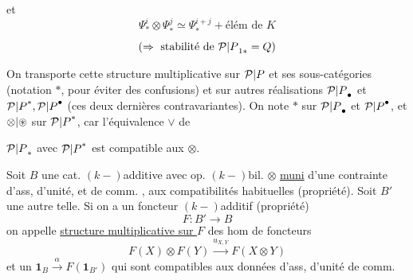 

et
\[
\Psi^i_*\otimes\Psi^j_*\simeq\Psi^{i+j}_*+\text{élém de }K
\]
\[
(\Rightarrow\text{ stabilité de }{{\mathcal P|P}_{1*}=Q})
\]

On transporte cette structure multiplicative sur ${\mathcal P|P}$ et ses sous-catégories (notation $*$, pour éviter des confusions) et sur autres réalisations ${\mathcal P|P}_\bullet$ et ${\mathcal P|P}^*,{\mathcal P|P}^\bullet$ (ces deux dernières contravariantes). On note $*$ sur ${\mathcal P|P}_\bullet$ et ${\mathcal P|P}^\bullet$, et ${\otimes|\mathbin{\circledast}}$ sur ${\mathcal P|P}^*$, car l'équivalence $\vee$ de

${\mathcal P|P}_*$ avec ${\mathcal P|P}^*$ est compatible aux $\otimes$.

Soit $B$ une cat. $(k-)$additive avec op. $(k-)$bil. $\otimes$  \uline{muni} d'une contrainte d'ass, d'unité, et de comm.  ,  aux compatibilités habituelles (propriété). Soit $B'$ une autre telle. Si on a un foncteur $(k-)$additif (propriété)
\[
F:B'\longrightarrow B
\]
on appelle \uline{structure multiplicative sur $F$} des hom de foncteurs
\[
F(X)\otimes F(Y)\xrightarrow{u_{X,Y}}F(X\otimes Y)
\]
et un  $\mathbf1_B\xrightarrow{\alpha}F(\mathbf1_{B'})$ qui sont compatibles aux données d'ass, d'unité de comm.


